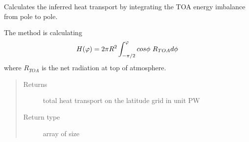 \documentclass[letterpaper,10pt,english]{sphinxmanual}
\begin{document}
\begin{fulllineitems}
\begin{fulllineitems}
\end{fulllineitems}


\begin{fulllineitems}
\label{api/climlab.model:climlab.model.ebm.EBM.inferred_heat_transport}
Calculates the inferred heat transport by integrating the TOA 
energy imbalance from pole to pole.

The method is calculating
\begin{gather}
\begin{split}H(\varphi) = 2 \pi R^2 \int_{-\pi/2}^{\varphi} cos\phi \ R_{TOA} d\phi\end{split}\notag
\end{gather}
where \(R_{TOA}\) is the net radiation at top of atmosphere.
\begin{quote}\begin{description}
\item[{Returns}] \leavevmode
total heat transport on the latitude grid in unit \(\textrm{PW}\)

\item[{Return type}] \leavevmode
array of size 

\end{description}\end{quote}

\end{fulllineitems}


\end{fulllineitems}

\end{document}
